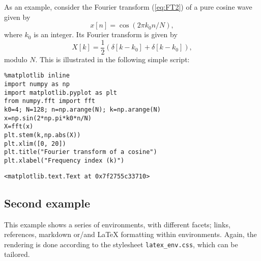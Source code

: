     As an example, consider the Fourier transform (\ref{eq:FT2}) of a pure
cosine wave given by \begin{equation}
x[n]= \cos(2\pi k_0 n/N),
\end{equation} where $k_0$ is an integer. Its Fourier transform is given by \begin{equation}
X[k] = \frac{1}{2} \left( \delta[k-k_0] + \delta[k-k_0] \right), 
\end{equation} modulo $N$. This is illustrated in the following simple script:
\begin{lstlisting}
%matplotlib inline
import numpy as np
import matplotlib.pyplot as plt 
from numpy.fft import fft
k0=4; N=128; n=np.arange(N); k=np.arange(N)
x=np.sin(2*np.pi*k0*n/N)
X=fft(x)
plt.stem(k,np.abs(X))
plt.xlim([0, 20])
plt.title("Fourier transform of a cosine")
plt.xlabel("Frequency index (k)")
\end{lstlisting}%
%
    
    
    \begin{verbatim}
<matplotlib.text.Text at 0x7f2755c33710>
    \end{verbatim}

    

    \begin{center}
    \end{center}
    
    \subsection{Second example}\label{second-example}

    This example shows a series of environments, with different facets;
links, references, markdown or/and LaTeX formatting within environments.
Again, the rendering is done according to the stylesheet
\texttt{latex\_env.css}, which can be tailored.


